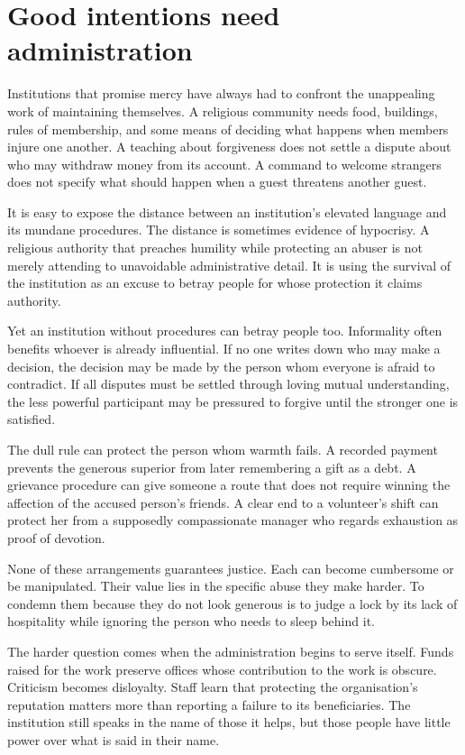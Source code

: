 \documentclass[12pt,a4paper]{book}
\begin{document}
\section*{Good intentions need administration}

Institutions that promise mercy have always had to confront the unappealing work of maintaining themselves. A religious community needs food, buildings, rules of membership, and some means of deciding what happens when members injure one another. A teaching about forgiveness does not settle a dispute about who may withdraw money from its account. A command to welcome strangers does not specify what should happen when a guest threatens another guest.

It is easy to expose the distance between an institution's elevated language and its mundane procedures. The distance is sometimes evidence of hypocrisy. A religious authority that preaches humility while protecting an abuser is not merely attending to unavoidable administrative detail. It is using the survival of the institution as an excuse to betray people for whose protection it claims authority.

Yet an institution without procedures can betray people too. Informality often benefits whoever is already influential. If no one writes down who may make a decision, the decision may be made by the person whom everyone is afraid to contradict. If all disputes must be settled through loving mutual understanding, the less powerful participant may be pressured to forgive until the stronger one is satisfied.

The dull rule can protect the person whom warmth fails. A recorded payment prevents the generous superior from later remembering a gift as a debt. A grievance procedure can give someone a route that does not require winning the affection of the accused person's friends. A clear end to a volunteer's shift can protect her from a supposedly compassionate manager who regards exhaustion as proof of devotion.

None of these arrangements guarantees justice. Each can become cumbersome or be manipulated. Their value lies in the specific abuse they make harder. To condemn them because they do not look generous is to judge a lock by its lack of hospitality while ignoring the person who needs to sleep behind it.

The harder question comes when the administration begins to serve itself. Funds raised for the work preserve offices whose contribution to the work is obscure. Criticism becomes disloyalty. Staff learn that protecting the organisation's reputation matters more than reporting a failure to its beneficiaries. The institution still speaks in the name of those it helps, but those people have little power over what is said in their name.
\end{document}
